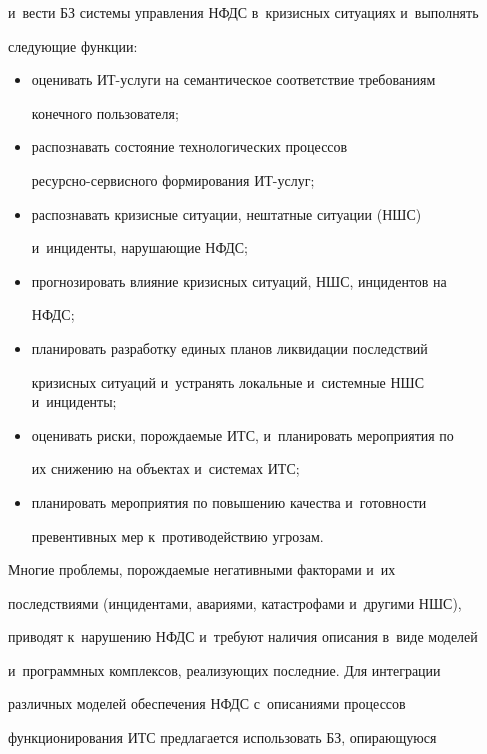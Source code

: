и~вести БЗ системы управления НФДС в~кризисных ситуациях и~выполнять


следующие функции:


  \begin{itemize}


  \item  оценивать ИТ-услуги на семантическое соответствие требованиям


конечного пользователя;


  \item распознавать состояние технологических процессов


  ре\-сурс\-но-сер\-вис\-но\-го формирования ИТ-услуг;


  \item  распознавать кризисные ситуации, нештатные ситуации (НШС)


и~инциденты, нарушающие НФДС;


  \item  прогнозировать влияние кризисных ситуаций, НШС, инцидентов на


НФДС;


  \item  планировать разработку единых планов ликвидации последствий


кризисных ситуаций и~устранять локальные и~системные НШС и~инциденты;


  \item  оценивать риски, порождаемые ИТС, и~планировать мероприятия по


их снижению на объектах и~системах ИТС;


  \item  планировать мероприятия по повышению качества и~готовности


превентивных мер к~противодействию угрозам.


  \end{itemize}





  Многие проблемы, порождаемые негативными факторами и~их


последствиями (инцидентами, авариями, катастрофами и~другими НШС),


приводят к~нарушению НФДС и~требуют наличия описания в~виде моделей


и~программных комплексов, реализующих последние. Для интеграции


различных моделей обеспечения НФДС с~описаниями процессов


функционирования ИТС предлагается использовать БЗ, опирающуюся


